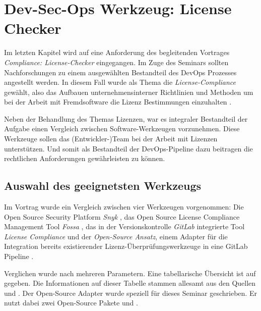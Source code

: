 \chapter{Dev-Sec-Ops Werkzeug: License Checker}

Im letzten Kapitel wird auf eine Anforderung des begleitenden Vortrages \emph{Compliance: License-Checker} eingegangen. 
Im Zuge des Seminars sollten Nachforschungen zu einem ausgewählten Bestandteil des DevOps Prozesses angestellt werden. 
In diesem Fall wurde als Thema die \emph{License-Compliance} gewählt, also das Aufbauen unternehmensinterner Richtlinien und Methoden um bei der Arbeit mit Fremdsoftware die Lizenz Bestimmungen einzuhalten \cite{validatisComplianceDefinitionBedeutung} \cite{haufe-lexwaregmbhcokgBedeutungComplianceFuer}.


\begin{sloppypar}
Neben der Behandlung des Themas Lizenzen, war es integraler Bestandteil der Aufgabe einen Vergleich zwischen Software-Werkzeugen vorzunehmen. Diese Werkzeuge sollen das \mbox{(Entwickler-)Team} bei der Arbeit mit Lizenzen unterstützen. Und somit als Bestandteil der DevOps-Pipeline dazu beitragen die rechtlichen Anforderungen gewährleisten zu können.
\end{sloppypar}

\section{Auswahl des geeignetsten Werkzeugs}

Im Vortrag wurde ein Vergleich zwischen vier Werkzeugen vorgenommen: Die \glqq Open Source Security Platform\grqq{} \emph{Snyk} \cite{snykLicensingComplianceManagement}, das \glqq Open Source License Compliance Management Tool\grqq{} \emph{Fossa} \cite{fossaOpenSourceLicense}, das in der Versionskontrolle \emph{GitLab} integrierte Tool \emph{License Compliance} \cite{gitlabLicenseComplianceGitLab} und der \emph{Open-Source Ansatz}, einem Adapter für die Integration bereits existierender Lizenz-Überprüfungs\-werkzeuge in eine GitLab Pipeline \cite{kellOpenSourceLicenseChecker2021}.

Verglichen wurde nach mehreren Parametern. Eine tabellarische Übersicht ist auf  gegeben. Die Informationen auf dieser Tabelle stammen allesamt aus den Quellen \cite{snykLicensingComplianceManagement} \cite{fossaOpenSourceLicense} und \cite{gitlabLicenseComplianceGitLab}. Der Open-Source Adapter wurde speziell für dieses Seminar geschrieben. Er nutzt dabei zwei Open-Source Pakete \cite{glassNPMLicenseChecker} und \cite{bauernfeindComposerLicenseChecker}.


